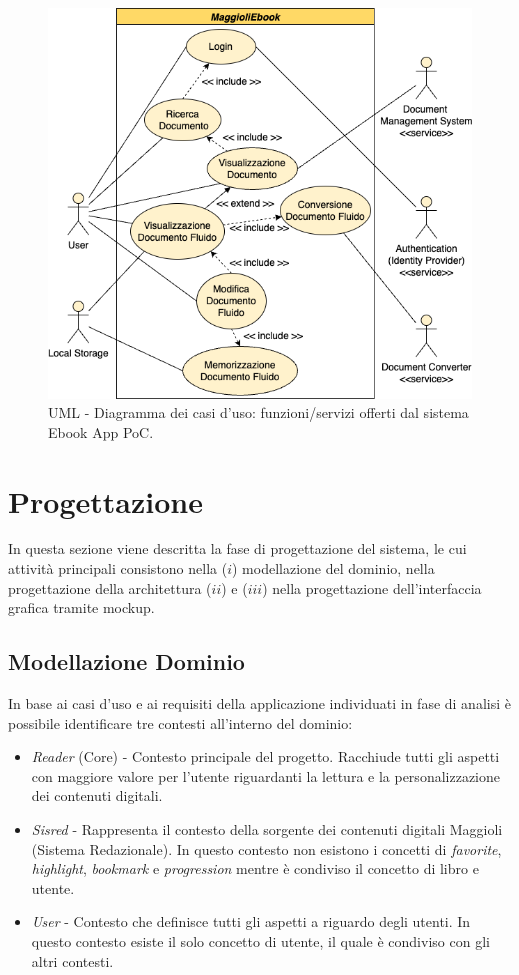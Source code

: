 \begin{figure}[H]
\centering
\includegraphics[width=1\textwidth]{img/tesi-1-Use-case.drawio.png}
\caption{UML - Diagramma dei casi d'uso: funzioni/servizi offerti dal sistema Ebook App PoC.}
\end{figure}

\section{Progettazione}
In questa sezione viene descritta la fase di progettazione del sistema, le cui attività principali consistono nella ($i$) modellazione del dominio, nella progettazione della architettura ($ii$) e ($iii$) nella progettazione dell'interfaccia grafica tramite mockup.

\subsection{Modellazione Dominio}
In base ai casi d'uso e ai requisiti della applicazione individuati in fase di analisi è possibile identificare tre contesti all'interno del dominio:

\begin{itemize}
    \item \textit{Reader} (Core) - Contesto principale del progetto. Racchiude tutti gli aspetti con maggiore valore per l'utente riguardanti la lettura e la personalizzazione dei contenuti digitali. 
    \item \textit{Sisred} - Rappresenta il contesto della sorgente dei contenuti digitali Maggioli (Sistema Redazionale\cite{amslaurea23043}). In questo contesto non esistono i concetti di \textit{favorite}, \textit{highlight}, \textit{bookmark} e \textit{progression} mentre è condiviso il concetto di libro e utente.
    \item \textit{User} - Contesto che definisce tutti gli aspetti a riguardo degli utenti. In questo contesto esiste il solo concetto di utente, il quale è condiviso con gli altri contesti.
\end{itemize}

